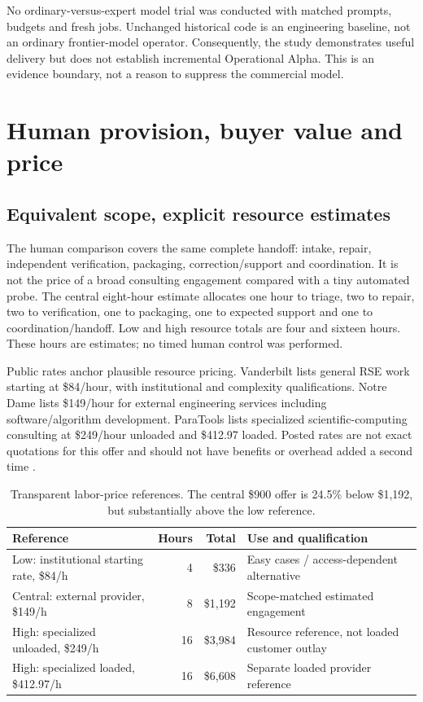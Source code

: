 No ordinary-versus-expert model trial was conducted with matched prompts, budgets and fresh jobs. Unchanged historical code is an engineering baseline, not an ordinary frontier-model operator. Consequently, the study demonstrates useful delivery but does not establish incremental Operational Alpha. This is an evidence boundary, not a reason to suppress the commercial model.

\section{Human provision, buyer value and price}
\subsection{Equivalent scope, explicit resource estimates}
The human comparison covers the same complete handoff: intake, repair, independent verification, packaging, correction/support and coordination. It is not the price of a broad consulting engagement compared with a tiny automated probe. The central eight-hour estimate allocates one hour to triage, two to repair, two to verification, one to packaging, one to expected support and one to coordination/handoff. Low and high resource totals are four and sixteen hours. These hours are estimates; no timed human control was performed.

Public rates anchor plausible resource pricing. Vanderbilt lists general RSE work starting at \$84/hour, with institutional and complexity qualifications. Notre Dame lists \$149/hour for external engineering services including software/algorithm development. ParaTools lists specialized scientific-computing consulting at \$249/hour unloaded and \$412.97 loaded. Posted rates are not exact quotations for this offer and should not have benefits or overhead added a second time \citep{vanderbilt,nd,paratools}.

\begin{table}[htbp]\centering\small
\begin{tabularx}{\linewidth}{@{}YrrY@{}}\toprule
Reference & Hours & Total & Use and qualification\\\midrule
Low: institutional starting rate, \$84/h & 4 & \$336 & Easy cases / access-dependent alternative\\
Central: external provider, \$149/h & 8 & \$1,192 & Scope-matched estimated engagement\\
High: specialized unloaded, \$249/h & 16 & \$3,984 & Resource reference, not loaded customer outlay\\
High: specialized loaded, \$412.97/h & 16 & \$6,608 & Separate loaded provider reference\\\bottomrule
\end{tabularx}
\caption{Transparent labor-price references. The central \$900 offer is 24.5\% below \$1,192, but substantially above the low reference.}
\end{table}

